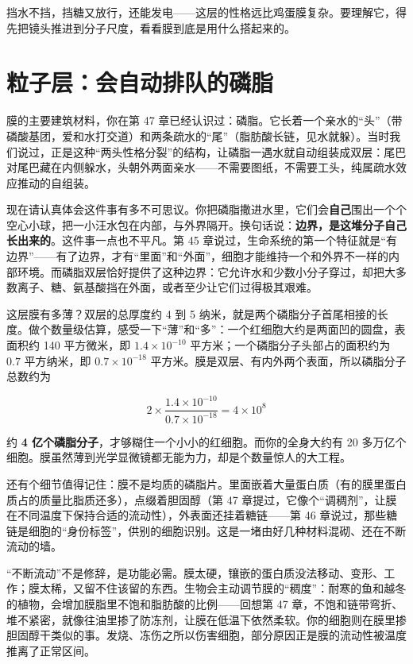 挡水不挡，挡糖又放行，还能发电——这层的性格远比鸡蛋膜复杂。要理解它，得先把镜头推进到分子尺度，看看膜到底是用什么搭起来的。

\section{粒子层：会自动排队的磷脂}

膜的主要建筑材料，你在第 47 章已经认识过：磷脂。它长着一个亲水的“头”（带磷酸基团，爱和水打交道）和两条疏水的“尾”（脂肪酸长链，见水就躲）。当时我们说过，正是这种“两头性格分裂”的结构，让磷脂一遇水就自动组装成双层：尾巴对尾巴藏在内侧躲水，头朝外两面亲水——不需要图纸，不需要工头，纯属疏水效应推动的自组装。

现在请认真体会这件事有多不可思议。你把磷脂撒进水里，它们会\textbf{自己}围出一个个空心小球，把一小汪水包在内部，与外界隔开。换句话说：\textbf{边界，是这堆分子自己长出来的}。这件事一点也不平凡。第 45 章说过，生命系统的第一个特征就是“有边界”——有了边界，才有“里面”和“外面”，细胞才能维持一个和外界不一样的内部环境。而磷脂双层恰好提供了这种边界：它允许水和少数小分子穿过，却把大多数离子、糖、氨基酸挡在外面，或者至少让它们过得极其艰难。

这层膜有多薄？双层的总厚度约 4 到 5 纳米，就是两个磷脂分子首尾相接的长度。做个数量级估算，感受一下“薄”和“多”：一个红细胞大约是两面凹的圆盘，表面积约 140 平方微米，即 $1.4\times 10^{-10}$ 平方米；一个磷脂分子头部占的面积约为 $0.7$ 平方纳米，即 $0.7\times 10^{-18}$ 平方米。膜是双层、有内外两个表面，所以磷脂分子总数约为

\[2\times \frac{1.4\times 10^{-10}}{0.7\times 10^{-18}} = 4\times 10^{8}\]

约 \textbf{4 亿个磷脂分子}，才够糊住一个小小的红细胞。而你的全身大约有 20 多万亿个细胞。膜虽然薄到光学显微镜都无能为力，却是个数量惊人的大工程。

还有个细节值得记住：膜不是均质的磷脂片。里面嵌着大量蛋白质（有的膜里蛋白质占的质量比脂质还多），点缀着胆固醇（第 47 章提过，它像个“调稠剂”，让膜在不同温度下保持合适的流动性），外表面还挂着糖链——第 46 章说过，那些糖链是细胞的“身份标签”，供别的细胞识别。这是一堵由好几种材料混砌、还在不断流动的墙。

“不断流动”不是修辞，是功能必需。膜太硬，镶嵌的蛋白质没法移动、变形、工作；膜太稀，又留不住该留的东西。生物会主动调节膜的“稠度”：耐寒的鱼和越冬的植物，会增加膜脂里不饱和脂肪酸的比例——回想第 47 章，不饱和链带弯折、堆不紧密，就像往油里掺了防冻剂，让膜在低温下依然柔软。你的细胞则在膜里掺胆固醇干类似的事。发烧、冻伤之所以伤害细胞，部分原因正是膜的流动性被温度推离了正常区间。

